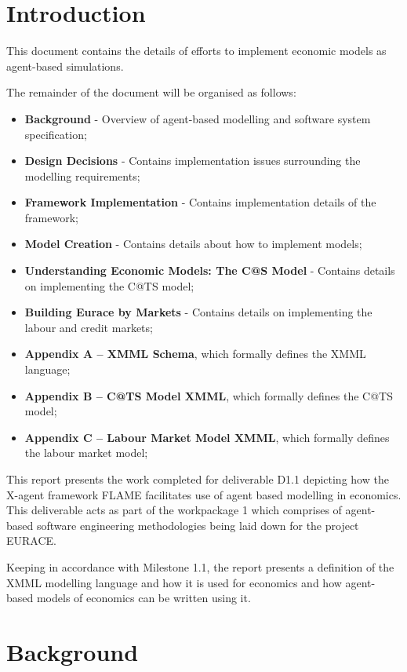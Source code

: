 \documentclass[a4paper,11pt]{article}
\begin{document}
\pagebreak

\section{Introduction}

This document contains the details of efforts to implement economic models
as agent-based simulations.

The remainder of the document will be organised as follows:

\begin{itemize}
\item \textbf{Background} - Overview of agent-based modelling and software system specification;
\item \textbf{Design Decisions} - Contains implementation issues surrounding the modelling requirements;
\item \textbf{Framework Implementation} - Contains implementation details of the framework;
\item \textbf{Model Creation} - Contains details about how to implement models;
\item \textbf{Understanding Economic Models: The C@S Model} - Contains details on implementing the C@TS model;
\item \textbf{Building Eurace by Markets} - Contains details on implementing the labour and credit markets;
\item \textbf{Appendix A -- XMML Schema}, which formally defines the XMML language;
\item \textbf{Appendix B -- C@TS Model XMML}, which formally defines the C@TS model;
\item \textbf{Appendix C -- Labour Market Model XMML}, which formally defines the labour market model;
\end{itemize}

This report presents the work completed for deliverable D1.1
depicting how the X-agent framework FLAME facilitates use of agent
based modelling in economics. This deliverable acts as part of the
workpackage 1 which comprises of agent-based software engineering
methodologies being laid down for the project EURACE.

Keeping in accordance with Milestone 1.1, the report presents a
definition of the XMML modelling language and how it is used for
economics and how agent-based models of economics can be written
using it.

\pagebreak

\section{Background}
\end{document}
